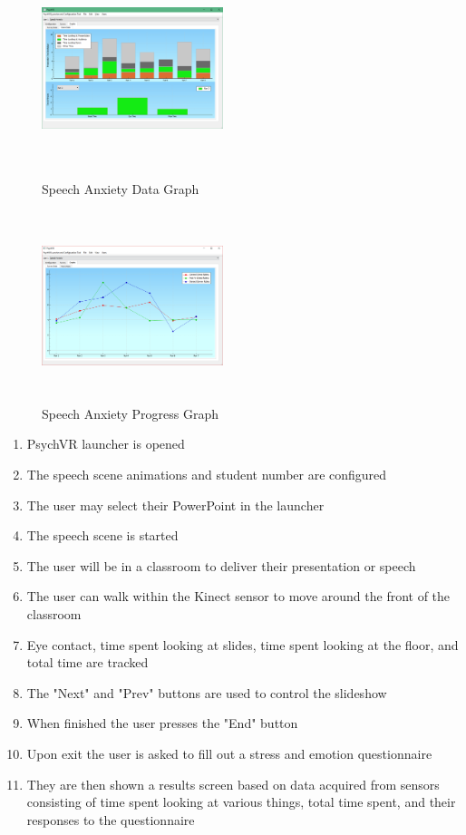 \documentclass[a4paper,10pt]{article}
\begin{document}
\begin{figure}[H]
	\centering
	\begin{minipage}{0.45\textwidth}
		\centering
		\includegraphics[width=200px, height=210px, keepaspectratio]{qtSpeechGraph.png}
		\caption{Speech Anxiety Data Graph}
		\label{fig:qtSpeechGraph}
	\end{minipage}\hfill
	\begin{minipage}{0.45\textwidth}
		\centering
		\includegraphics[width=200px, height=210px, keepaspectratio]{qtSpeechProgress.png}
		\caption{Speech Anxiety Progress Graph}
		\label{fig:qtSpeechProgress}
	\end{minipage}
\end{figure}
\begin{enumerate}
	\item PsychVR launcher is opened
	\item The speech scene animations and student number are configured
	\item The user may select their PowerPoint in the launcher
	\item The speech scene is started
	\item The user will be in a classroom to deliver their presentation or speech
	\item The user can walk within the Kinect sensor to move around the front of the classroom
	\item Eye contact, time spent looking at slides, time spent looking at the floor, and total time are tracked
	\item The "Next" and "Prev" buttons are used to control the slideshow
	\item When finished the user presses the "End" button
	\item Upon exit the user is asked to fill out a stress and emotion questionnaire
	\item They are then shown a results screen based on data acquired from sensors consisting of time spent looking at various things, total time spent, and their responses to the questionnaire
\end{enumerate}
\pagebreak
\end{document}
